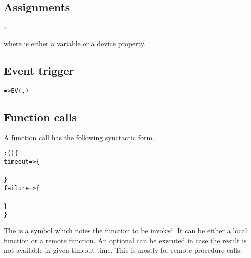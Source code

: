 \documentclass{note}\usepackage{mathptm,mydef}
\begin{document}
\subsection{Assignments}
\begin{alltt}
  \textcolor{red2}{\textrm{} = \textrm{}}
\end{alltt}
where \textcolor{red2}{\textrm{}} is either a variable
or a device property. 



\subsection{Event trigger}
\begin{alltt}
  \textcolor{red2}{=> EV(\textrm{}, \textrm{})}
\end{alltt}

\subsection{Function calls}
A function call has the following synctactic form.
\begin{alltt}
  \textcolor{red2}{\textrm{}:\textrm{}(\textrm{}) \{
    timeout \textrm{} => \{ 
      \textrm{} 
    \}
    failure => \{
      \textrm{} 
    \}
  \}}
\end{alltt}
The  is a symbol which notes the function to be invoked.
It can be either a local function or a remote function.
An optional  can be executed in case the result is not
available in given timeout time.
This is mostly for remote procedure calls.
\end{document}
